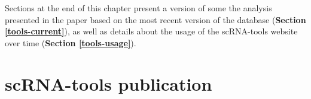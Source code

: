 \documentclass[11pt,a4paper,titlepage,twoside,openright]{style/unimelbthesis}
\theoremstyle{definition}
\theoremstyle{definition}
\theoremstyle{definition}
\theoremstyle{remark}
\begin{document}
\begin{mainmatter}
Sections at the end of this chapter present a version of some the analysis presented in the paper based on the most recent version of the database (\textbf{Section \ref{tools-current}}), as well as details about the usage of the scRNA-tools website over time (\textbf{Section \ref{tools-usage}}).

\hypertarget{scrna-tools-publication}{%
\section{scRNA-tools publication}\label{scrna-tools-publication}}

\clearpage

\end{mainmatter}
\end{document}
